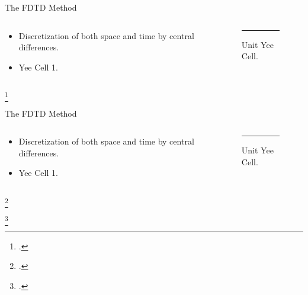 \documentclass[10pt]{beamer}
\newcounter{colcites}
\begin{document}
\begin{frame}{The FDTD Method}
  \begin{columns}
    \begin{column}{0.4\textwidth}
      \begin{itemize}
      \item Discretization of both space and time by central differences.
      \item Yee Cell 1.\footnotemark 
      \end{itemize}
    \end{column}

    \begin{column}{0.5\textwidth}
      \begin{figure}
      \centering
      \rule{0.9\columnwidth}{2cm}%
      \caption{Unit Yee Cell.}
      \end{figure}
    \end{column}
  \end{columns}
\footcitetext{Taflove2000}
\end{frame}

\begin{frame}{The FDTD Method}
\setcounter{colcites}{0}
  \begin{columns}
    \begin{column}{0.4\textwidth}
      \begin{itemize}
      \item Discretization of both space and time by central differences.\footnotemark\addtocounter{colcites}{1} 
      \item Yee Cell 1.\footnotemark\addtocounter{colcites}{1}  
      \end{itemize}
    \end{column}

    \begin{column}{0.5\textwidth}
      \begin{figure}
      \centering
      \rule{0.9\columnwidth}{2cm}%
      \caption{Unit Yee Cell.}
      \end{figure}
    \end{column}
  \end{columns}

\addtocounter{footnote}{-\thecolcites}
\addtocounter{footnote}{1}
\footcitetext[\thefootnote]{Taflove2000}
\addtocounter{footnote}{1}
\footcitetext[\thefootnote]{label2}
\end{frame}
\end{document}

